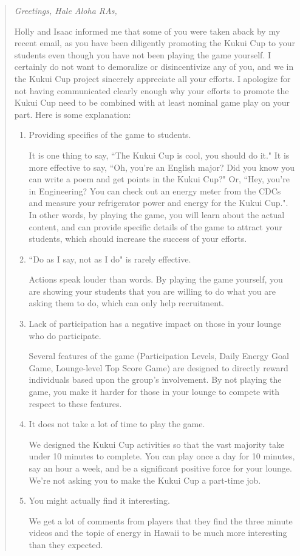 \documentclass[]{article}
\begin{document}
\begin{quotation}
{\em
\noindent Greetings, Hale Aloha RAs,

\noindent Holly and Isaac informed me that some of you were taken aback by my
recent email, as you have been diligently promoting the Kukui Cup to
your students even though you have not been playing the game yourself.
 I certainly do not want to demoralize or disincentivize any of you,
and we in the Kukui Cup project sincerely appreciate all your efforts.
 I apologize for not having communicated clearly enough why your
efforts to promote the Kukui Cup need to be combined with at least
nominal game play on your part.  Here is some explanation:

\begin{enumerate}[noitemsep]
\item Providing specifics of the game to students.

It is one thing to say, ``The Kukui Cup is cool, you should do it."  It
is more effective to say, ``Oh, you're an English major? Did you know
you can write a poem and get points in the Kukui Cup?"  Or, ``Hey,
you're in Engineering?   You can check out an energy meter from the
CDCs and measure your refrigerator power and energy for the Kukui
Cup.".  In other words, by playing the game, you will learn about the
actual content, and can provide specific details of the game to
attract your students, which should increase the success of your
efforts.

\item ``Do as I say, not as I do" is rarely effective.

Actions speak louder than words.    By playing the game yourself, you
are showing your students that you are willing to do what you are
asking them to do, which can only help recruitment.

\item Lack of participation has a negative impact on those in your lounge who do participate.

Several features of the game (Participation Levels, Daily Energy Goal
Game, Lounge-level Top Score Game) are designed to directly reward
individuals based upon the group's involvement. By not playing the
game, you make it harder for those in your lounge to compete with
respect to these features.

\item It does not take a lot of time to play the game.

We designed the Kukui Cup activities so that the vast majority take
under 10 minutes to complete. You can play once a day for 10 minutes,
say an hour a week, and be a significant positive force for your
lounge.  We're not asking you to make the Kukui Cup a part-time job.

\item You might actually find it interesting.

We get a lot of comments from players that they find the three minute
videos and the topic of energy in Hawaii to be much more interesting
than they expected.
\end{enumerate}

}
\end{quotation}
\end{document}

